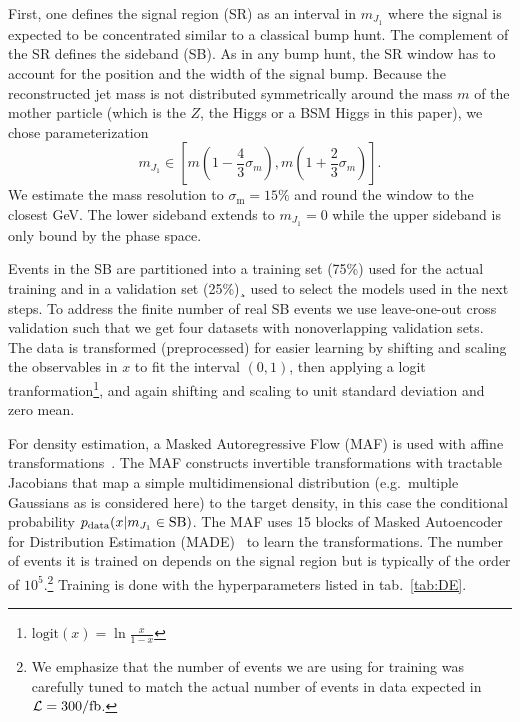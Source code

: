 \documentclass[prd, twocolumn, superscriptaddress,floatfix, nofootinbib, preprintnumbers]{revtex4-2}
\begin{document}
First, one defines the signal region (SR) as an interval in $m_{J_1}$ where the signal is expected to be concentrated similar to a classical bump hunt. The complement of the SR defines the sideband (SB). 
As in any bump hunt, the SR window has to account for the position and the width of the signal bump. Because the reconstructed jet mass is not distributed symmetrically around the mass $m$ of the mother particle  (which is the $Z$, the Higgs or a BSM Higgs in this paper), we chose parameterization
\begin{equation} \label{eq:SR}
 m_{J_1} \in [m  \left( 1-\frac{4}{3}\sigma_m\right),m  \left( 1+\frac{2}{3}\sigma_m\right)].
\end{equation}
  We estimate the mass resolution to $\sigma_\text{m} = 15\%$ and round the window to the closest GeV. The lower sideband extends to $m_{J_1}=0$ while the upper sideband is only bound by the phase space.


Events in the SB are partitioned into a training set (75\%) used for the actual training and in a validation set (25\%)¸ used to select the models used in the next steps. To address the finite number of real SB events we use leave-one-out cross validation such that we get four datasets with nonoverlapping validation sets. The data is transformed (preprocessed) for easier learning by shifting and scaling the observables in $x$ to fit the interval $(0,1)$, then applying a logit tranformation\footnote{$\text{logit}(x)=\ln \frac{x}{1-x}$}, and again shifting and scaling to unit standard deviation and zero mean.

For density estimation, a Masked Autoregressive Flow (MAF) is used with affine transformations~\cite{MAF}.
The MAF constructs invertible transformations with tractable Jacobians that map a simple multidimensional distribution (e.g.\ multiple Gaussians as is considered here) to the target density, in this case the conditional probability $p_\text{data}(x\vert m_{J_1}\in{\rm SB})$. The MAF uses 15 blocks of Masked Autoencoder for Distribution Estimation (MADE)~\cite{MADE} to learn the transformations. The number of events it is trained on depends on the signal region but is typically of the order of $10^5$.\footnote{We emphasize that the number of events we are using for training was carefully tuned to match the actual number of events in data expected in ${\mathcal L}=300/{\rm fb}$.} Training is done with the hyperparameters listed in tab.~\ref{tab:DE}.
\end{document}

